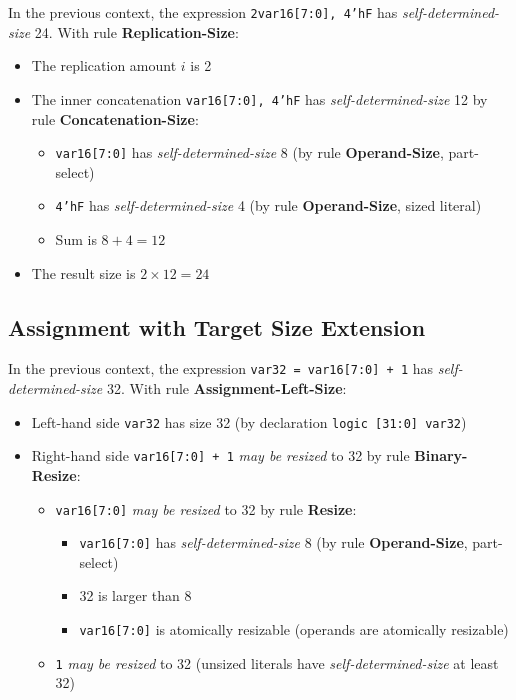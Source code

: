 \documentclass{article}
\newcommand{\sv}[1]{\texttt{#1}}
\newcommand{\sds}{\emph{self-determined-size}}
\newcommand{\mbr}{\emph{may be resized}}
\begin{document}
In the previous context, the expression \sv{{2{var16[7:0], 4'hF}}} has \sds{}
24. With rule \textbf{Replication-Size}:

\begin{itemize}
  \item The replication amount $i$ is 2
  \item The inner concatenation \sv{{var16[7:0], 4'hF}} has
    \sds{} 12 by rule \textbf{Concatenation-Size}:
    \begin{itemize}
      \item \sv{var16[7:0]} has \sds{} 8 (by rule
        \textbf{Operand-Size}, part-select)
      \item \sv{4'hF} has \sds{} 4 (by rule
        \textbf{Operand-Size}, sized literal)
      \item Sum is $8 + 4 = 12$
    \end{itemize}
  \item The result size is $2 \times 12 = 24$
\end{itemize}

\subsection{Assignment with Target Size Extension}

In the previous context, the expression \sv{var32 = var16[7:0] + 1} has
\sds{} 32. With rule \textbf{Assignment-Left-Size}:

\begin{itemize}
  \item Left-hand side \sv{var32} has size 32 (by declaration
    \sv{logic [31:0] var32})
  \item Right-hand side \sv{var16[7:0] + 1} \mbr{} to 32 by
    rule \textbf{Binary-Resize}:
    \begin{itemize}
      \item \sv{var16[7:0]} \mbr{} to 32 by rule
        \textbf{Resize}:
        \begin{itemize}
          \item \sv{var16[7:0]} has \sds{} 8
            (by rule \textbf{Operand-Size}, part-select)
          \item 32 is larger than 8
          \item \sv{var16[7:0]} is atomically resizable
            (operands are atomically resizable)
        \end{itemize}
      \item \sv{1} \mbr{} to 32 (unsized literals have
        \sds{} at least 32)
    \end{itemize}
\end{itemize}
\end{document}
